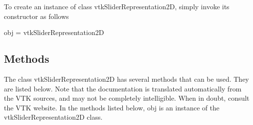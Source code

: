 To create an instance of class vtk\-Slider\-Representation2\-D, simply invoke its constructor as follows \begin{DoxyVerb}  obj = vtkSliderRepresentation2D
\end{DoxyVerb}
 \hypertarget{vtkwidgets_vtkxyplotwidget_Methods}{}\subsection{Methods}\label{vtkwidgets_vtkxyplotwidget_Methods}
The class vtk\-Slider\-Representation2\-D has several methods that can be used. They are listed below. Note that the documentation is translated automatically from the V\-T\-K sources, and may not be completely intelligible. When in doubt, consult the V\-T\-K website. In the methods listed below, {\ttfamily obj} is an instance of the vtk\-Slider\-Representation2\-D class. 
